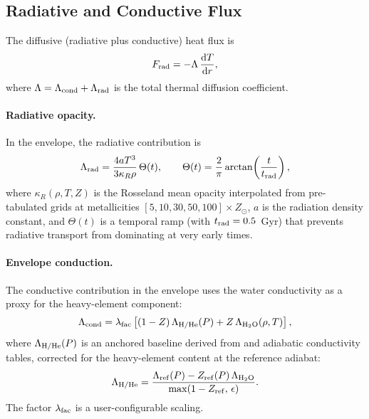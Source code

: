 \documentclass{aastex631}
\newcommand{\dd}{\mathrm{d}}
\begin{document}
\subsection{Radiative and Conductive Flux}\label{sec:rad}

The diffusive (radiative plus conductive) heat flux is
\begin{equation}\label{eq:Frad}
  F_{\rm rad} = -\Lambda\,\frac{\dd T}{\dd r},
\end{equation}
where $\Lambda = \Lambda_{\rm cond} + \Lambda_{\rm rad}$ is the total
thermal diffusion coefficient.

\paragraph{Radiative opacity.}
In the envelope, the radiative contribution is
\begin{equation}\label{eq:Lambda_rad}
  \Lambda_{\rm rad}
  = \frac{4aT^3}{3\kappa_R\rho}\,\Theta(t),
  \qquad
  \Theta(t) = \frac{2}{\pi}\arctan\!\left(\frac{t}{t_{\rm rad}}\right),
\end{equation}
where $\kappa_R(\rho,T,Z)$ is the Rosseland mean opacity interpolated from
pre-tabulated grids at metallicities $[5,10,30,50,100]\times Z_\odot$, $a$
is the radiation density constant, and $\Theta(t)$ is a temporal ramp
(with $t_{\rm rad}=0.5$~Gyr) that prevents radiative transport from
dominating at very early times.

\paragraph{Envelope conduction.}
The conductive contribution in the envelope uses the \citet{French2019}
water conductivity as a proxy for the heavy-element component:
\begin{equation}\label{eq:Lambda_cond_env}
  \Lambda_{\rm cond}
  = \lambda_{\rm fac}\left[
      (1-Z)\,\Lambda_{\rm H/He}(P)
    + Z\,\Lambda_{\rm H_2O}(\rho,T)
    \right],
\end{equation}
where $\Lambda_{\rm H/He}(P)$ is an anchored baseline derived from
\citet{French2019} and \citet{Becker2018} adiabatic conductivity tables,
corrected for the heavy-element content at the reference adiabat:
\begin{equation}
  \Lambda_{\rm H/He}
  = \frac{\Lambda_{\rm ref}(P) - Z_{\rm ref}(P)\,\Lambda_{\rm H_2O}}
         {\max(1 - Z_{\rm ref},\,\epsilon)}.
\end{equation}
The factor $\lambda_{\rm fac}$ is a user-configurable scaling.
\end{document}
